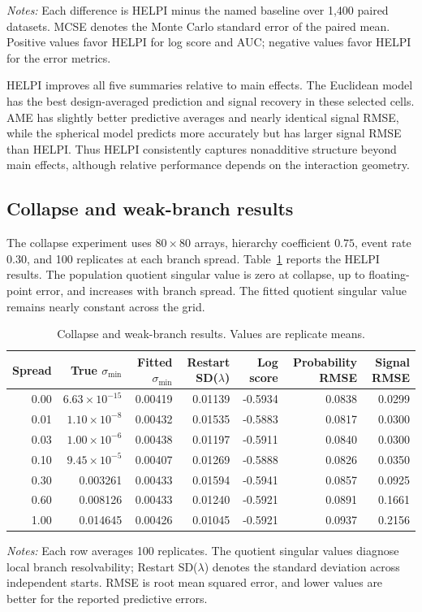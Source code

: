 \documentclass[
  12pt]{article}
\newcommand{\TableNote}[1]{%
  \par\vspace{0.35em}\noindent
  \begin{minipage}{0.96\linewidth}
    \footnotesize\setstretch{1.05}\raggedright
    \textit{Notes:} #1
  \end{minipage}%
  \par\vspace{0.6\baselineskip}%
}
\theoremstyle{definition}
\theoremstyle{plain}
\begin{document}
\TableNote{Each difference is HELPI minus the named baseline over 1,400 paired datasets. MCSE denotes the Monte Carlo standard error of the paired mean. Positive values favor HELPI for log score and AUC; negative values favor HELPI for the error metrics.}
\endgroup


HELPI improves all five summaries relative to main effects. The Euclidean model has the best design-averaged prediction and signal recovery in these selected cells. AME has slightly better predictive averages and nearly identical signal RMSE, while the spherical model predicts more accurately but has larger signal RMSE than HELPI. Thus HELPI consistently captures nonadditive structure beyond main effects, although relative performance depends on the interaction geometry.




\subsection{Collapse and weak-branch results}
\label{supp:collapse-results}

The collapse experiment uses $80\times80$ arrays, hierarchy coefficient $0.75$, event rate $0.30$, and 100 replicates at each branch spread. Table~\ref{tab:collapse} reports the HELPI results. The population quotient singular value is zero at collapse, up to floating-point error, and increases with branch spread. The fitted quotient singular value remains nearly constant across the grid.

\begin{table}[H]
	\centering
	\scriptsize
	\caption{Collapse and weak-branch results. Values are replicate means.}
	\label{tab:collapse}
	\begin{tabular}{rrrrrrr}
		\toprule
		Spread & True $\sigma_{\min}$ & Fitted $\sigma_{\min}$ & Restart SD($\lambda$) & Log score & Probability RMSE & Signal RMSE \\
		\midrule
		0.00 & $6.63\times10^{-15}$ & 0.00419 & 0.01139 & -0.5934 & 0.0838 & 0.0299 \\
		0.01 & $1.10\times10^{-8}$ & 0.00432 & 0.01535 & -0.5883 & 0.0817 & 0.0300 \\
		0.03 & $1.00\times10^{-6}$ & 0.00438 & 0.01197 & -0.5911 & 0.0840 & 0.0300 \\
		0.10 & $9.45\times10^{-5}$ & 0.00407 & 0.01269 & -0.5888 & 0.0826 & 0.0350 \\
		0.30 & 0.003261 & 0.00433 & 0.01594 & -0.5941 & 0.0857 & 0.0925 \\
		0.60 & 0.008126 & 0.00433 & 0.01240 & -0.5921 & 0.0891 & 0.1661 \\
		1.00 & 0.014645 & 0.00426 & 0.01045 & -0.5921 & 0.0937 & 0.2156 \\
		\bottomrule
	\end{tabular}
	\TableNote{Each row averages 100 replicates. The quotient singular values diagnose local branch resolvability; Restart SD($\lambda$) denotes the standard deviation across independent starts. RMSE is root mean squared error, and lower values are better for the reported predictive errors.}
\end{table}
\end{document}
